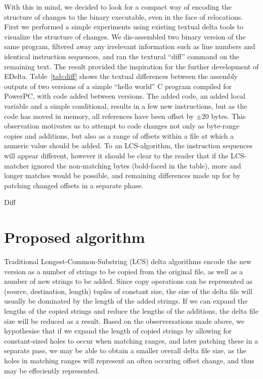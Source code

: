 \documentclass[10pt,twocolumn]{article}
\begin{document}
With this in mind, we decided to look for a compact way of encoding the
structure of changes to the binary executable, even in the face of relocations.
First we performed a simple experiments using existing textual delta tools to
visualize the structure of changes. We dis-assembled two binary version of the
same program, filtered away any irrelevant information such as line numbers and
identical instruction sequences, and ran the textural ``diff'' command on the
remaining text. The result provided the inspiration for the further development
of EDelta.  Table~\ref{tab:diff} shows the textual differences between the
assembly outputs of two versions of a simple ``hello world'' C program compiled
for PowerPC, with code added between versions. The added code, an added local
variable and a simple conditional, results in a few new instructions, but as the
code has moved in memory, all references have been offset by $\pm 20$ bytes. This
observation motivates us to attempt to code changes not only as byte-range
copies and additions, but also as a range of offsets within a file at which a
numeric value should be added. To an LCS-algorithm, the instruction sequences
will appear different, however it should be clear to the reader that if the
LCS-matcher ignored the non-matching bytes (bold-faced in the table), more
and longer matches would be possible, and remaining differences made up for by
patching changed offsets in a separate phase.


\begin{table*}
\begin{center}

\end{center}
\caption{ \label{tab:diff} Diff}
\end{table*}

\section{Proposed algorithm}

Traditional Longest-Common-Substring (LCS) delta algorithms encode the new
version as a number of strings to be copied from the original file, as well as a
number of new strings to be added. Since copy operations can be represented as
(source, destination, length) tuples of constant size, the size of the delta
file will usually be dominated by the length of the added strings. If we can
expand the lengths of the copied strings and reduce the lengths of the
additions, the delta file size will be reduced as a result. Based on the
observersations made above, we hypothesise that if we expand the length of
copied strings by allowing for constant-sized holes to occur when matching
ranges, and later patching these in a separate pass, we may be able to obtain a
smaller overall delta file size, as the holes in matching ranges will represent
an often occuring offset change, and thus may be effeciently represented.
\end{document}
